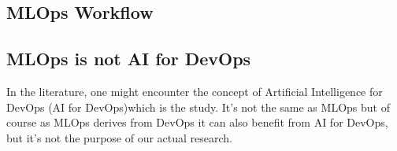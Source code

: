 \subsection{MLOps Workflow}\label{subsec:mlops-workflow}


\subsection{MLOps is not AI for DevOps}\label{subsec:mlops-is-not-ai-for-devops}
In the literature, one might encounter the concept of Artificial Intelligence for DevOps (AI for DevOps)which is the study.
It's not the same as MLOps but of course as MLOps derives from DevOps it can also benefit from AI for DevOps,
but it's not the purpose of our actual research.